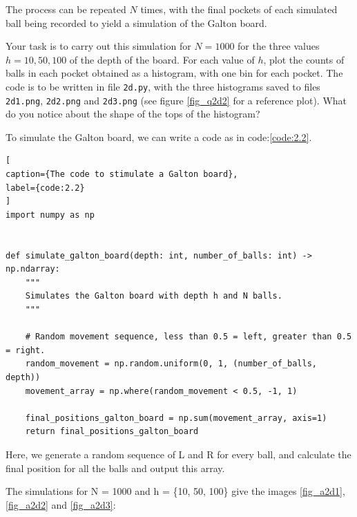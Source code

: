 \begin{tcolorbox}
    The process can be repeated $N$ times, with the final pockets of each
    simulated ball being recorded to yield a simulation of the Galton board.

    Your task is to carry out this simulation for $N = 1000$ for the three values
    $h = 10, 50, 100$ of the depth of the board. For each value of $h$, plot the
    counts of balls in each pocket obtained as a histogram, with one bin for each
    pocket. The code is to be written in file \texttt{2d.py}, with the three
    histograms saved to files \texttt{2d1.png}, \texttt{2d2.png} and
    \texttt{2d3.png} (see figure \ref{fig_q2d2} for a reference plot). What do you
    notice about the shape of the tops of the histogram?  
\end{tcolorbox}


\vspace{10pt}
\noindent To simulate the Galton board, we can write a code as in
code:\ref{code:2.2}.

\begin{lstlisting}[
caption={The code to stimulate a Galton board},
label={code:2.2}
]
import numpy as np


def simulate_galton_board(depth: int, number_of_balls: int) -> np.ndarray:
    """
    Simulates the Galton board with depth h and N balls.
    """
    
    # Random movement sequence, less than 0.5 = left, greater than 0.5 = right.
    random_movement = np.random.uniform(0, 1, (number_of_balls, depth))
    movement_array = np.where(random_movement < 0.5, -1, 1)
    
    final_positions_galton_board = np.sum(movement_array, axis=1)
    return final_positions_galton_board
\end{lstlisting}

Here, we generate a random sequence of L and R for every ball, and calculate the final position for all the balls and output this array.

The simulations for N = 1000 and h = \{10, 50, 100\} give the images \ref{fig_a2d1}, \ref{fig_a2d2} and \ref{fig_a2d3}:

